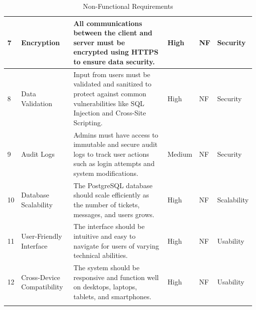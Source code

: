 \begin{longtable}{|m{0.5cm}|m{2.5cm}|m{7cm}|m{1.5cm}|m{1.7cm}|m{2.4cm}|}
		7  & Encryption                  & All communications between the client and server must be encrypted using HTTPS to ensure data security.                                    & High     & NF        & Security    \\ \hline
		8  & Data Validation             & Input from users must be validated and sanitized to protect against common vulnerabilities like SQL Injection and Cross-Site Scripting.     & High     & NF        & Security    \\ \hline
		9  & Audit Logs                  & Admins must have access to immutable and secure audit logs to track user actions such as login attempts and system modifications.           & Medium   & NF        & Security    \\ \hline
		10 & Database Scalability        & The PostgreSQL database should scale efficiently as the number of tickets, messages, and users grows.                                       & High     & NF        & Scalability \\ \hline
		11 & User-Friendly Interface     & The interface should be intuitive and easy to navigate for users of varying technical abilities.                                            & High     & NF        & Usability   \\ \hline
		12 & Cross-Device Compatibility  & The system should be responsive and function well on desktops, laptops, tablets, and smartphones.                                           & High     & NF        & Usability   \\ \hline
	
		\caption{Non-Functional Requirements}
	\label{tab:nonfunctionalRequirements}
	
	\end{longtable}



